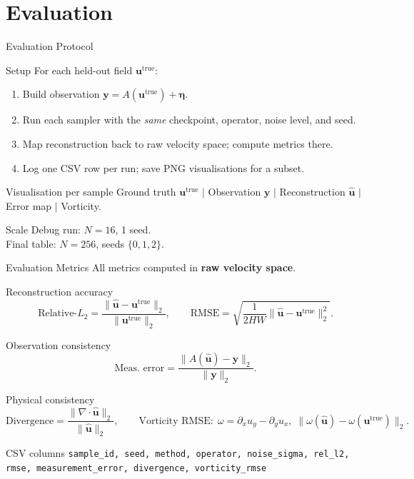 \documentclass[9pt]{beamer}
\begin{document}
\section{Evaluation}

\begin{frame}{Evaluation Protocol}
\begin{block}{Setup}
For each held-out field $\mathbf{u}^\text{true}$:
\begin{enumerate}
  \item Build observation $\mathbf{y} = A(\mathbf{u}^\text{true}) + \boldsymbol{\eta}$.
  \item Run each sampler with the \emph{same} checkpoint, operator, noise level, and seed.
  \item Map reconstruction back to raw velocity space; compute metrics there.
  \item Log one CSV row per run; save PNG visualisations for a subset.
\end{enumerate}
\end{block}
\begin{block}{Visualisation per sample}
Ground truth $\mathbf{u}^\text{true}$ $\mid$ Observation $\mathbf{y}$ $\mid$ Reconstruction $\hat{\mathbf{u}}$ $\mid$ Error map $\mid$ Vorticity.
\end{block}
\begin{block}{Scale}
Debug run: $N = 16$, 1 seed.\\
Final table: $N = 256$, seeds $\{0, 1, 2\}$.
\end{block}
\end{frame}


\begin{frame}{Evaluation Metrics}
All metrics computed in \textbf{raw velocity space}.

\begin{block}{Reconstruction accuracy}
\[
  \text{Relative-}L_2 = \frac{\|\hat{\mathbf{u}} - \mathbf{u}^\text{true}\|_2}{\|\mathbf{u}^\text{true}\|_2},
  \qquad
  \text{RMSE} = \sqrt{\frac{1}{2HW}\|\hat{\mathbf{u}} - \mathbf{u}^\text{true}\|_2^2}.
\]
\end{block}
\begin{block}{Observation consistency}
\[
  \text{Meas.\ error} = \frac{\|A(\hat{\mathbf{u}}) - \mathbf{y}\|_2}{\|\mathbf{y}\|_2}.
\]
\end{block}
\begin{block}{Physical consistency}
\[
  \text{Divergence} = \frac{\|\nabla\cdot\hat{\mathbf{u}}\|_2}{\|\hat{\mathbf{u}}\|_2},
  \qquad
  \text{Vorticity RMSE}: \; \omega = \partial_x u_y - \partial_y u_x,\; \|\omega(\hat{\mathbf{u}}) - \omega(\mathbf{u}^\text{true})\|_2.
\]
\end{block}
\begin{block}{CSV columns}
\small\texttt{sample\_id, seed, method, operator, noise\_sigma, rel\_l2, rmse, measurement\_error, divergence, vorticity\_rmse}
\end{block}
\end{frame}
\end{document}
